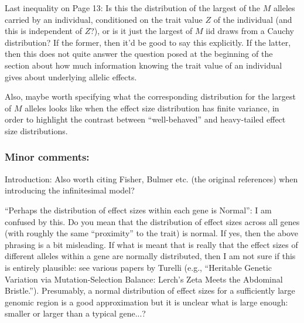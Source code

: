 \reply{
}


\begin{point}{}
    Last inequality on Page 13: Is this the distribution of the largest of the $M$ alleles carried by an individual, conditioned on the trait value $Z$ of the individual (and this is independent of $Z$?), or is it just the largest of $M$ iid draws from a Cauchy distribution? If the former, then it'd be good to say this explicitly. If the latter, then this does not quite answer the question posed at the beginning of the section about how much information knowing the trait value of an individual gives about underlying allelic effects.
\end{point}

\reply{
}

\begin{point}{}
Also, maybe worth specifying what the corresponding distribution for the largest of $M$ alleles looks like when the effect size distribution has finite variance, in order to highlight the contrast between ``well-behaved'' and heavy-tailed effect size distributions.
\end{point}

\reply{
}

\subsubsection{Minor comments:}

\begin{point}{}
    Introduction: Also worth citing Fisher, Bulmer etc. (the original references) when introducing the infinitesimal model?
\end{point}

\reply{
}

\begin{point}{\revref}
    ``Perhaps the distribution of effect sizes within each gene is Normal'': I am confused by this. Do you mean that the distribution of effect sizes across all genes (with roughly the same ``proximity'' to the trait) is normal. If yes, then the above phrasing is a bit misleading. If what is meant that is really that the effect sizes of different alleles within a gene are normally distributed, then I am not sure if this is entirely plausible: see various papers by Turelli (e.g., ``Heritable Genetic Variation via Mutation-Selection Balance: Lerch's Zeta Meets the Abdominal Bristle.''). Presumably, a normal distribution of effect sizes for a sufficiently large genomic region is a good approximation but it is unclear what is large enough: smaller or larger than a typical gene...?
\end{point}

